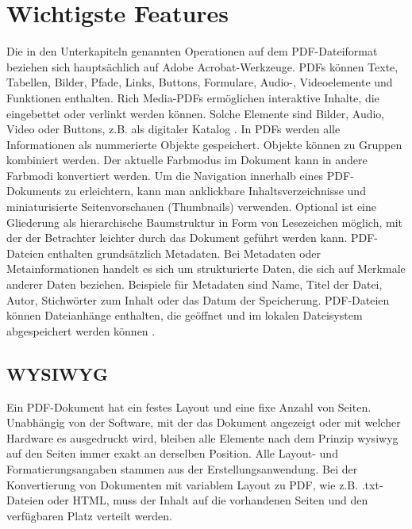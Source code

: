 \section{Wichtigste Features}
Die in den Unterkapiteln genannten Operationen auf dem PDF-Dateiformat beziehen sich hauptsächlich auf Adobe Acrobat-Werkzeuge. PDFs können Texte, Tabellen, Bilder, Pfade, Links, Buttons, Formulare, Audio-, Videoelemente und Funktionen enthalten. Rich Media-PDFs ermöglichen interaktive Inhalte, die eingebettet oder verlinkt werden können. Solche Elemente sind Bilder, Audio, Video oder Buttons, z.B. als digitaler Katalog \cite{wiki-pdf-engl}. In PDFs werden alle Informationen als nummerierte Objekte gespeichert. Objekte können zu Gruppen kombiniert werden. Der aktuelle Farbmodus im Dokument kann in andere Farbmodi konvertiert werden. Um die Navigation innerhalb eines PDF-Dokuments zu erleichtern, kann man anklickbare Inhaltsverzeichnisse und miniaturisierte Seitenvorschauen (Thumbnails) verwenden. Optional ist eine Gliederung als hierarchische Baumstruktur in Form von Lesezeichen möglich, mit der der Betrachter leichter durch das Dokument geführt werden kann. PDF-Dateien enthalten grundsätzlich Metadaten. Bei Metadaten oder Metainformationen handelt es sich um strukturierte Daten, die sich auf Merkmale anderer Daten beziehen. Beispiele für Metadaten sind Name, Titel der Datei, Autor, Stichwörter zum Inhalt oder das Datum der Speicherung. PDF-Dateien können Dateianhänge enthalten, die geöffnet und im lokalen Dateisystem abgespeichert werden können \cite{wiki-pdf-engl}. 

\subsection{WYSIWYG}
Ein PDF-Dokument hat ein festes Layout und eine fixe Anzahl von Seiten. Unabhängig von der Software, mit der das Dokument angezeigt oder mit welcher Hardware es ausgedruckt wird, bleiben alle Elemente nach dem Prinzip \gls{wysiwyg} auf den Seiten immer exakt an derselben Position. Alle Layout- und Formatierungsangaben stammen aus der Erstellungsanwendung. Bei der Konvertierung von Dokumenten mit variablem Layout zu PDF, wie z.B. .txt-Dateien oder HTML, muss der Inhalt auf die vorhandenen Seiten und den verfügbaren Platz verteilt werden. 

